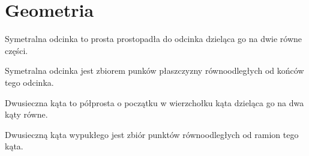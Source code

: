 \chapter{Geometria}

\begin{definition}
  Symetralna odcinka to prosta prostopadła do odcinka dzieląca go na dwie równe części.
\end{definition}

\begin{theorem}
  Symetralna odcinka jest zbiorem punków płaszczyzny równoodległych od końców tego odcinka.
\end{theorem}

\begin{definition}
  Dwusieczna kąta to półprosta o początku w wierzchołku kąta dzieląca go na dwa kąty równe.
\end{definition}

\begin{theorem}
  Dwusieczną kąta wypukłego jest zbiór punktów równoodległych od ramion tego kąta.
\end{theorem}

\begin{center}
\end{center}

